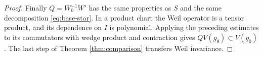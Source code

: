 \begin{proof}
Finally $Q=W_0^{-1}W'$ has the same properties as $S$ and the
same decomposition \eqref{eq:base-star}. In a product chart the
Weil operator is a tensor product, and its dependence on $I$ is
polynomial. Applying the preceding estimates to its commutators
with wedge product and contraction gives $QV(g_0)\subset V(g_0)$.
The last step of Theorem \ref{thm:comparison} transfers Weil
invariance.
\end{proof}
